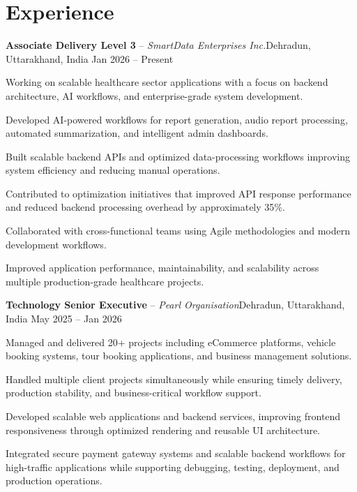 \documentclass[10pt,a4paper]{moderncv}
\newcommand*{\role}[4]{
  \textbf{#1} -- {\itshape #2}\hfill{\small #3 \textbar{} #4}\\[-0.7mm]
}
\begin{document}
\begin{minipage}[t]{0.66\textwidth}
\footnotesize
\section{Experience}
\role{Associate Delivery Level 3}{SmartData Enterprises Inc.}{Dehradun, Uttarakhand, India}{Jan 2026 -- Present}
\begin{resitemize}
  \item Working on scalable healthcare sector applications with a focus on backend architecture, AI workflows, and enterprise-grade system development.
  \item Developed AI-powered workflows for report generation, audio report processing, automated summarization, and intelligent admin dashboards.
  \item Built scalable backend APIs and optimized data-processing workflows improving system efficiency and reducing manual operations.
  \item Contributed to optimization initiatives that improved API response performance and reduced backend processing overhead by approximately 35\%.
  \item Collaborated with cross-functional teams using Agile methodologies and modern development workflows.
  \item Improved application performance, maintainability, and scalability across multiple production-grade healthcare projects.
\end{resitemize}

\role{Technology Senior Executive}{Pearl Organisation}{Dehradun, Uttarakhand, India}{May 2025 -- Jan 2026}
\begin{resitemize}
  \item Managed and delivered 20+ projects including eCommerce platforms, vehicle booking systems, tour booking applications, and business management solutions.
  \item Handled multiple client projects simultaneously while ensuring timely delivery, production stability, and business-critical workflow support.
  \item Developed scalable web applications and backend services, improving frontend responsiveness through optimized rendering and reusable UI architecture.
  \item Integrated secure payment gateway systems and scalable backend workflows for high-traffic applications while supporting debugging, testing, deployment, and production operations.
\end{resitemize}


\end{minipage}
\end{document}
